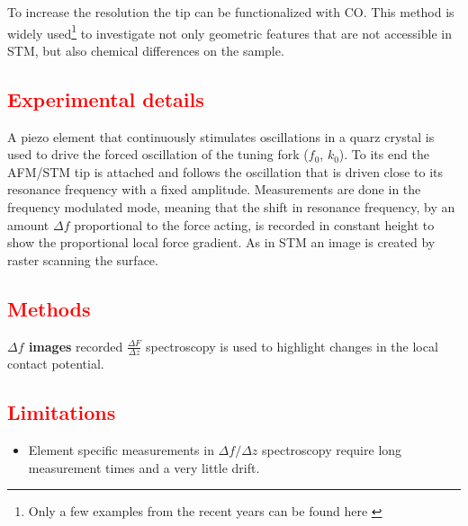 To increase the resolution the tip can be functionalized with CO. This method is widely used\footnote{Only a few examples from the recent years can be found here \cite{albrecht_direct_2016, kawai_multiple_2018, kawai_atomically_2015, schulz_elemental_2018, gross_chemical_2009, pavlicek_generation_2017, schwarz_corrugation_2017}} to investigate not only geometric features that are not accessible in STM, but also chemical differences on the sample\cite{wang_exploration_2017}.

\subsection{\textcolor{red}{\textbf{Experimental details}}}
A piezo element that continuously stimulates oscillations in a quarz crystal is used to drive the forced oscillation of the tuning fork ($f_0$, $k_0$). To its end the AFM/STM tip is attached and follows the oscillation that is driven close to its resonance frequency with a fixed amplitude. Measurements are done in the frequency modulated mode, meaning that the shift in resonance frequency, by an amount $\Delta f$  proportional to the force acting, is recorded in constant height to show the proportional local force gradient. As in STM an image is created by raster scanning the surface.

\subsection{\textcolor{red}{\textbf{Methods}}}
\textbf{$\Delta f $ images} recorded 
\textbf{$\frac{\Delta F}{\Delta z}$} spectroscopy is used to highlight changes in the local contact potential.
\subsection{\textcolor{red}{\textbf{Limitations}}}

\begin{itemize}
	\item Element specific measurements in $\Delta f / \Delta z$ spectroscopy require long measurement times and a very little drift.
\end{itemize}